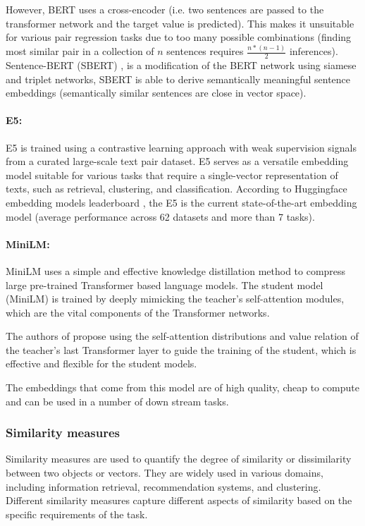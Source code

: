 \documentclass[a4paper,12pt]{article}
\begin{document}
However, BERT \cite{bert} uses a cross-encoder (i.e. two sentences are passed to the transformer network and the target value is predicted). This makes it unsuitable for various pair regression tasks due to too many possible combinations (finding most similar pair in a collection of $n$ sentences requires $\frac{n*(n-1)}{2}$ inferences). Sentence-BERT (SBERT) \cite{sbert}, is a modification of the BERT network using siamese and triplet networks, SBERT is able to
derive semantically meaningful sentence embeddings (semantically similar sentences are close in vector space).

\paragraph{E5:}
E5 \cite{e5} is trained using a contrastive learning approach with weak supervision signals from a curated large-scale text pair dataset. 
E5 serves as a versatile embedding model suitable for various tasks that require a single-vector representation of texts, such as retrieval, clustering, and classification. 
According to Huggingface embedding models leaderboard \cite{embedding-leaderboard}, the E5 \cite{e5} is the current state-of-the-art embedding model (average performance across 62 datasets and more than 7 tasks).

\paragraph{MiniLM:}
MiniLM \cite{minilm} uses a simple and effective knowledge distillation method to compress large pre-trained Transformer based language models. The student model (MiniLM) is trained by deeply mimicking the teacher’s self-attention \cite{attention} modules,
which are the vital components of the Transformer networks.

The authors of \cite{minilm} propose using the self-attention distributions and value
relation of the teacher’s last Transformer layer to guide the
training of the student, which is effective and flexible for the student models. 

The embeddings that come from this model are of high quality, cheap to compute and can be used in a number of down stream tasks.


\subsubsection{Similarity measures}
Similarity measures are used to quantify the degree of similarity or dissimilarity between two objects or vectors. They are widely used in various domains, including information retrieval, recommendation systems, and clustering. Different similarity measures capture different aspects of similarity based on the specific requirements of the task.
\end{document}
